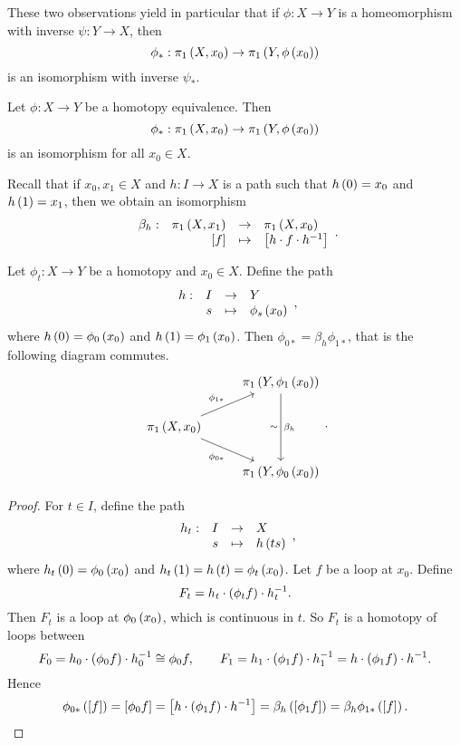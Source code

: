 These two observations yield in particular that if $ \phi : X \to Y $ is a homeomorphism with inverse $ \psi : Y \to X $, then
$$ \phi_* : \pi_1\left( X, x_0 \right) \to \pi_1\left( Y, \phi\left( x_0 \right) \right) $$
is an isomorphism with inverse $ \psi_* $.


\begin{proposition}
\label{prop:1.18}
Let $ \phi : X \to Y $ be a homotopy equivalence. Then
$$ \phi_* : \pi_1\left( X, x_0 \right) \to \pi_1\left( Y, \phi\left( x_0 \right) \right) $$
is an isomorphism for all $ x_0 \in X $.
\end{proposition}

Recall that if $ x_0, x_1 \in X $ and $ h : I \to X $ is a path such that $ h\left( 0 \right) = x_0 $ and $ h\left( 1 \right) = x_1 $, then we obtain an isomorphism
$$ \function[\beta_h]{\pi_1\rb{X, x_1}}{\pi_1\rb{X, x_0}}{\sb{f}}{\sb{h \cdot f \cdot h^{-1}}}. $$

\begin{lemma}
\label{lem:1.19}
Let $ \phi_t : X \to Y $ be a homotopy and $ x_0 \in X $. Define the path
$$ \function[h]{I}{Y}{s}{\phi_s\rb{x_0}}, $$
where $ h\left( 0 \right) = \phi_0\left( x_0 \right) $ and $ h\left( 1 \right) = \phi_1\left( x_0 \right) $. Then $ \phi_{0*} = \beta_h\phi_{1*} $, that is the following diagram commutes.
$$
\begin{tikzcd}
& \pi_1\rb{Y, \phi_1\rb{x_0}} \arrow{dd}{\beta_h}[swap]{\sim} \\
\pi_1\rb{X, x_0} \arrow{ur}{\phi_{1*}} \arrow[swap]{dr}{\phi_{0*}} & \\
& \pi_1\rb{Y, \phi_0\rb{x_0}}
\end{tikzcd}.
$$
\end{lemma}

\pagebreak

\begin{proof}
For $ t \in I $, define the path
$$ \function[h_t]{I}{X}{s}{h\rb{ts}}, $$
where $ h_t\left( 0 \right) = \phi_0\left( x_0 \right) $ and $ h_t\left( 1 \right) = h\left( t \right) = \phi_t\left( x_0 \right) $. Let $ f $ be a loop at $ x_0 $. Define
$$ F_t = h_t \cdot \left( \phi_tf \right) \cdot h_t^{-1}. $$
Then $ F_t $ is a loop at $ \phi_0\left( x_0 \right) $, which is continuous in $ t $. So $ F_t $ is a homotopy of loops between
$$ F_0 = h_0 \cdot \left( \phi_0f \right) \cdot h_0^{-1} \cong \phi_0f, \qquad F_1 = h_1 \cdot \left( \phi_1f \right) \cdot h_1^{-1} = h \cdot \left( \phi_1f \right) \cdot h^{-1}. $$
Hence
$$ \phi_{0*}\left( \left[ f \right] \right) = \left[ \phi_0f \right] = \left[ h \cdot \left( \phi_1f \right) \cdot h^{-1} \right] = \beta_h\left( \left[ \phi_1f \right] \right) = \beta_h\phi_{1*}\left( \left[ f \right] \right). $$
\end{proof}


